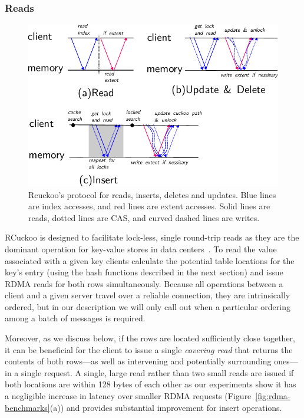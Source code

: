 \subsubsection{Reads} 
\label{sec:reading}

\begin{figure}[t]
\includegraphics[width=0.99\linewidth]{fig/message_diagram.pdf}
\caption{Rcuckoo's protocol for reads, inserts, deletes and
updates. Blue lines are index accesses, and red lines are
extent accesses. Solid lines are reads, dotted lines are
CAS, and curved dashed lines are writes.}
\label{fig:message_diagram}
\end{figure}

RCuckoo is designed to facilitate lock-less, single round-trip reads as
they are the dominant operation for key-value stores in data
centers~\cite{facebook-memcached}. To read the value associated with a
given key clients calculate the potential table locations for the
key's entry (using the hash functions described in the next section)
and issue RDMA reads for both rows simultaneously.  Because all
operations between a client and a given server travel over a reliable
connection, they are intrinsically ordered, but in our description we
will only call out when a particular ordering among a batch of
messages is required.

Moreover, as we discuss below, if the rows are
located sufficiently close together, it can be beneficial for the
client to issue a single \emph{covering read} that returns the
contents of both rows---as well as intervening and potentially
surrounding ones---in a single request.
A single, large read rather than two small reads are issued
if both locations are within
128 bytes of each other as our experiments show it has a negligible
increase in latency over smaller RDMA requests
(Figure~\ref{fig:rdma-benchmarks}(a)) and provides substantial
improvement for insert operations.

